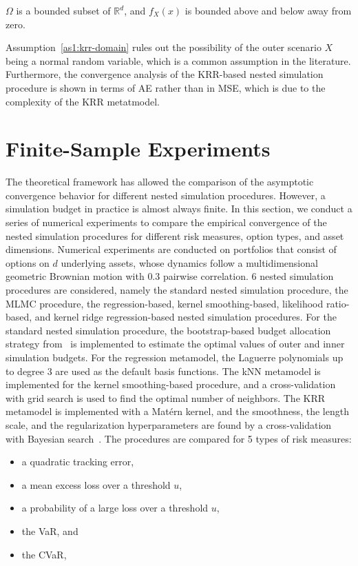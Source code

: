 \begin{assumption} \label{as1:krr-domain}
    $\Omega$ is a bounded subset of $\mathbb{R}^d$, and $f_X(x)$ is bounded above and below away from zero.
\end{assumption}

Assumption~\ref{as1:krr-domain} rules out the possibility of the outer scenario $X$ being a normal random variable, which is a common assumption in the literature.
Furthermore, the convergence analysis of the KRR-based nested simulation procedure is shown in terms of AE rather than in MSE, which is due to the complexity of the KRR metatmodel.

\section{Finite-Sample Experiments} \label{sec1:numerical-experiments}
The theoretical framework has allowed the comparison of the asymptotic convergence behavior for different nested simulation procedures.
However, a simulation budget in practice is almost always finite.
In this section, we conduct a series of numerical experiments to compare the empirical convergence of the nested simulation procedures for different risk measures, option types, and asset dimensions.
Numerical experiments are conducted on portfolios that consist of options on $d$ underlying assets, whose dynamics follow a multidimensional geometric Brownian motion with $0.3$ pairwise correlation.
6 nested simulation procedures are considered, namely the standard nested simulation procedure, the MLMC procedure, the regression-based, kernel smoothing-based, likelihood ratio-based, and kernel ridge regression-based nested simulation procedures.
For the standard nested simulation procedure, the bootstrap-based budget allocation strategy from~\cite{zhang2021bootstrap} is implemented to estimate the optimal values of outer and inner simulation budgets.
For the regression metamodel, the Laguerre polynomials up to degree $3$ are used as the default basis functions.
The kNN metamodel is implemented for the kernel smoothing-based procedure, and a cross-validation with grid search is used to find the optimal number of neighbors.
The KRR metamodel is implemented with a Mat\'ern kernel, and the smoothness, the length scale, and the regularization hyperparameters are found by a cross-validation with Bayesian search~\citep{frazier2018bayesian}.
The procedures are compared for 5 types of risk measures:
\begin{itemize}
    \item a quadratic tracking error,
    \item a mean excess loss over a threshold $u$,
    \item a probability of a large loss over a threshold $u$,
    \item the VaR, and
    \item the CVaR,
\end{itemize}

